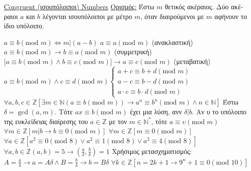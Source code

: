 \documentclass[12pt]{article}
\def\mod{\text{mod\ }} %
\begin{document}
\begin{flushleft}
	\uline{Congruent (\textgreek{ισουπόλοιποι}) Numbers} \linebreak 
	\textbullet \quad \textgreek{\uline{Ορισμός:} Έστω} $m$ \textgreek{θετικός ακέραιος. Δύο ακέραιοι} $a$ \textgreek{και} $b$ \textgreek{λέγονται ισουπόλοιποι με μέτρο} $m$, \textgreek{όταν διαιρούμενοι με} $m$ \textgreek{αφήνουν το ίδιο υπόλοιπο}. \linebreak 
	
	\textbullet \quad $a \equiv b (\mod m) \Leftrightarrow m | (a-b) $ \linebreak 
	\textbullet \quad $a \equiv a (\mod m) $ \textgreek{(ανακλαστική)} \linebreak 
	\textbullet \quad $a \equiv b (\mod m) \rightarrow b\equiv a (\mod m) $ \textgreek{(συμμετρική)} \linebreak 
	\textbullet \quad $\big[ a\equiv b (\mod m) \land b\equiv c (\mod m) \big]  \rightarrow a \equiv c (\mod m) $ (\textgreek{μεταβατική}) \linebreak 
	\textbullet \quad $ a \equiv b (\mod m) \land c \equiv d (\mod m) \begin{cases} 
		a + c \equiv b + d (\mod m) \\ 
		a - c \equiv b - d (\mod m) \\ 
		a \cdot c \equiv b \cdot d (\mod m) 
	\end{cases} $ \linebreak 
	\textbullet \quad $ \forall a, b, c \in \mathbb{Z} \left[ \exists m \in \mathbb{N} (a \equiv b (\mod m) ) \rightarrow a^n \equiv b^n (\mod m) \land n\in \mathbb{N} \right] $ \linebreak 
	\textbullet \quad \textgreek{Έστω} $ \delta = \gcd (a, m)$. \textgreek{Τότε} $ax \equiv b (\mod m)$ \textgreek{έχει μια λύση, ανν} $\delta | b$. \linebreak 
	\textbullet \quad \textgreek{Αν υ το υπόλοιπο της ευκλείδειας διαίρεσης του} $a\in \mathbb{Z}$ \textgreek{με τον} $m \in \mathbb{N}^*$, \textgreek{τότε} $a \equiv \upsilon (\mod m) $ \linebreak 
	\textbullet \quad $\forall m \in \mathbb{Z} \left[ m | b \rightarrow b \equiv 0 (\mod m) \right] $ \linebreak 
	\textbullet \quad $\forall m \in \mathbb{Z} \left[ m\equiv 0 (\mod m) \right] $ \linebreak 
	\textbullet \quad $\forall a \in \mathbb{Z} \left[ a^2 \equiv 0 (\mod 8) \lor a^2 \equiv 1 (\mod 8) \lor a^2 \equiv 4 (\mod 8) \right] $ \linebreak 
	\textbullet \quad $ \forall a, b \in \mathbb{Z} (a, b) = 5 \rightarrow \left( \frac{a}{\delta}, \frac{b}{\delta} \right) = 1$ \linebreak 
		\textgreek{Χρήσιμος μετασχηματισμός}: $\displaystyle A = \frac{a}{\delta} \rightarrow a = A \delta \land B = \frac{b}{\delta} \rightarrow b = B \delta $ \linebreak 
	\textbullet \quad $ \forall k \in \mathbb{Z} \left[ n = 2k + 1 \rightarrow 9^n + 1 \equiv 0 (\mod 10) \right] $ \linebreak 
	

\end{flushleft}
\end{document}
